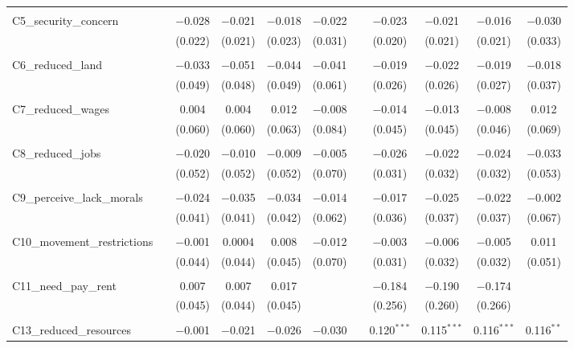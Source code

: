 \begin{table}[H]
\begin{tabular}{@{\extracolsep{4pt}}lcccccccccc}
  & & & & & & & & & & \\ 
 C5\_security\_concern &  & $-$0.028 & $-$0.021 & $-$0.018 & $-$0.022 &  & $-$0.023 & $-$0.021 & $-$0.016 & $-$0.030 \\ 
  &  & (0.022) & (0.021) & (0.023) & (0.031) &  & (0.020) & (0.021) & (0.021) & (0.033) \\ 
  & & & & & & & & & & \\ 
 C6\_reduced\_land &  & $-$0.033 & $-$0.051 & $-$0.044 & $-$0.041 &  & $-$0.019 & $-$0.022 & $-$0.019 & $-$0.018 \\ 
  &  & (0.049) & (0.048) & (0.049) & (0.061) &  & (0.026) & (0.026) & (0.027) & (0.037) \\ 
  & & & & & & & & & & \\ 
 C7\_reduced\_wages &  & 0.004 & 0.004 & 0.012 & $-$0.008 &  & $-$0.014 & $-$0.013 & $-$0.008 & 0.012 \\ 
  &  & (0.060) & (0.060) & (0.063) & (0.084) &  & (0.045) & (0.045) & (0.046) & (0.069) \\ 
  & & & & & & & & & & \\ 
 C8\_reduced\_jobs &  & $-$0.020 & $-$0.010 & $-$0.009 & $-$0.005 &  & $-$0.026 & $-$0.022 & $-$0.024 & $-$0.033 \\ 
  &  & (0.052) & (0.052) & (0.052) & (0.070) &  & (0.031) & (0.032) & (0.032) & (0.053) \\ 
  & & & & & & & & & & \\ 
 C9\_perceive\_lack\_morals &  & $-$0.024 & $-$0.035 & $-$0.034 & $-$0.014 &  & $-$0.017 & $-$0.025 & $-$0.022 & $-$0.002 \\ 
  &  & (0.041) & (0.041) & (0.042) & (0.062) &  & (0.036) & (0.037) & (0.037) & (0.067) \\ 
  & & & & & & & & & & \\ 
 C10\_movement\_restrictions &  & $-$0.001 & 0.0004 & 0.008 & $-$0.012 &  & $-$0.003 & $-$0.006 & $-$0.005 & 0.011 \\ 
  &  & (0.044) & (0.044) & (0.045) & (0.070) &  & (0.031) & (0.032) & (0.032) & (0.051) \\ 
  & & & & & & & & & & \\ 
 C11\_need\_pay\_rent &  & 0.007 & 0.007 & 0.017 &  &  & $-$0.184 & $-$0.190 & $-$0.174 &  \\ 
  &  & (0.045) & (0.044) & (0.045) &  &  & (0.256) & (0.260) & (0.266) &  \\ 
  & & & & & & & & & & \\ 
 C13\_reduced\_resources &  & $-$0.001 & $-$0.021 & $-$0.026 & $-$0.030 &  & 0.120$^{***}$ & 0.115$^{***}$ & 0.116$^{***}$ & 0.116$^{**}$ \\ 

\end{tabular}
\end{table}
